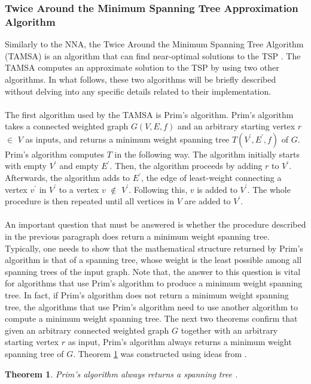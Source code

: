 \documentclass[12pt]{article}
\newtheorem{theorem}[definition]{Theorem}
\numberwithin{equation}{subsection}
\numberwithin{table}{subsection}
\numberwithin{algorithm}{subsection}
\numberwithin{figure}{subsection}
\begin{document}
\subsubsection{Twice Around the Minimum Spanning Tree Approximation Algorithm}
\label{TAMSA_SECTION}
Similarly to the NNA, the Twice Around the Minimum Spanning Tree Algorithm (TAMSA) is an algorithm that can find near-optimal solutions to the TSP \cite{cormen_leiserson_rivest_stein}. The TAMSA computes an approximate solution to the TSP by using two other algorithms. In what follows, these two algorithms will be briefly described without delving into any specific details related to their implementation.\\\\
The first algorithm used by the TAMSA is Prim's algorithm. Prim's algorithm takes a connected weighted graph $G(V,E,f)$ and an arbitrary starting vertex $r$ $\in$ $V$ as inputs, and returns a minimum weight spanning tree $T(V^\prime,E^\prime,f)$ of $G$. Prim's algorithm computes $T$ in the following way. The algorithm initially starts with empty $V^\prime$ and empty $E^\prime$. Then, the algorithm proceeds by adding $r$ to $V^\prime$. Afterwards, the algorithm adds to $E^\prime$, the edge of least-weight connecting a vertex $v^\prime$ in $V^\prime$ to a vertex $v$ $\notin$ $V^\prime$. Following this, $v$ is added to $V^\prime$. The whole procedure is then repeated until all vertices in $V$ are added to $V^\prime$. \cite{harris_hirst_mossinghoff_2008}\\\\
An important question that must be answered is whether the procedure described in the previous paragraph does return a minimum weight spanning tree. Typically, one needs to show that the mathematical structure returned by Prim's algorithm is that of a spanning tree, whose weight is the least possible among all spanning trees of the input graph. Note that, the answer to this question is vital for algorithms that use Prim's algorithm to produce a minimum weight spanning tree. In fact, if Prim's algorithm does not return a minimum weight spanning tree, the algorithms that use Prim's algorithm need to use another algorithm to compute a minimum weight spanning tree. The next two theorems confirm that given an arbitrary connected weighted graph $G$ together with an arbitrary starting vertex $r$ as input, Prim's algorithm always returns a minimum weight spanning tree of $G$. Theorem \ref{correctness1} was constructed using ideas from \cite{prim's_algorithm}.
\begin{theorem}
\label{correctness1}
Prim's algorithm always returns a spanning tree {}.
\end{theorem}
\end{document}

